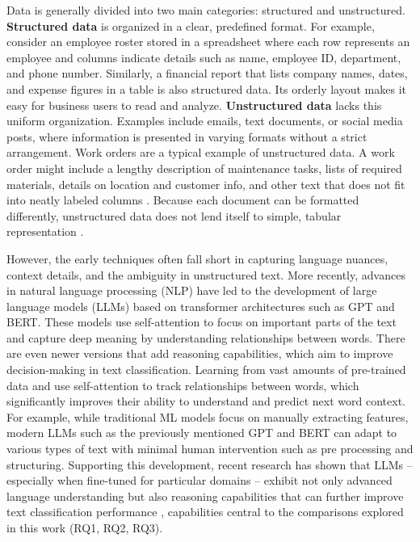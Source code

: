 Data is generally divided into two main categories: structured and unstructured. \textbf{Structured data} is organized in a clear, predefined format. For example, consider an employee roster stored in a spreadsheet where each row represents an employee and columns indicate details such as name, employee ID, department, and phone number. Similarly, a financial report that lists company names, dates, and expense figures in a table is also structured data. Its orderly layout makes it easy for business users to read and analyze. \textbf{Unstructured data} lacks this uniform organization. Examples include emails, text documents, or social media posts, where information is presented in varying formats without a strict arrangement. Work orders are a typical example of unstructured data. A work order might include a lengthy description of maintenance tasks, lists of required materials, details on location and customer info, and other text that does not fit into neatly labeled columns \cite{ibm2023work}. Because each document can be formatted differently, unstructured data does not lend itself to simple, tabular representation \cite{ibm2025datadiff}.

However, the early techniques often fall short in capturing language nuances, context details, and the ambiguity in unstructured text. More recently, advances in natural language processing (NLP) have led to the development of large language models (LLMs) based on transformer architectures such as GPT and BERT. These models use self-attention to focus on important parts of the text and capture deep meaning by understanding relationships between words. There are even newer versions that add reasoning capabilities, which aim to improve decision-making in text classification. Learning from vast amounts of pre-trained data and use self-attention to track relationships between words, which significantly improves their ability to understand and predict next word context. For example, while traditional ML models focus on manually extracting features, modern LLMs such as the previously mentioned GPT and BERT can adapt to various types of text with minimal human intervention such as pre processing and structuring. Supporting this development, recent research has shown that LLMs -- especially when fine-tuned for particular domains -- exhibit not only advanced language understanding but also reasoning capabilities that can further improve text classification performance \cite{huang2024classification, andersson2024ikea, merritt2022transformer, nazyrova2024medical, wang2024classifiers}, capabilities central to the comparisons explored in this work (RQ1, RQ2, RQ3).

